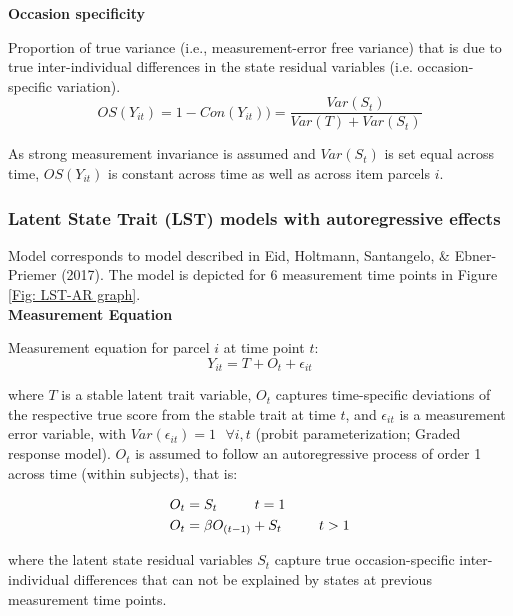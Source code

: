 \textbf{Occasion specificity}

Proportion of true variance (i.e., measurement-error free variance) that is due to true inter-individual differences in the state residual variables (i.e. occasion-specific variation).
\begin{equation}
OS(Y_{it})=1-Con(Y_{it})) = \frac{Var(S_t)}{Var(T)+Var(S_t)}
\end{equation}

As strong measurement invariance is assumed and $Var(S_t)$ is set equal across time, $OS(Y_{it})$ is constant across time as well as across item parcels $i$. 


\subsubsection{Latent State Trait (LST) models with autoregressive effects}

Model corresponds to model described in Eid, Holtmann, Santangelo, \& Ebner-Priemer (2017). The model is depicted for 6 measurement time points in Figure \ref{Fig: LST-AR graph}. \\


\textbf{Measurement Equation}

Measurement equation for parcel $i$ at time point $t$:
\begin{equation}
Y_{it}= T+ O_t + \epsilon_{it}
\end{equation}

where $T$ is a stable latent trait variable, $O_t$ captures time-specific deviations of the respective true score from the stable trait at time $t$, and $\epsilon_{it}$ is a measurement error variable,  with $Var(\epsilon_{it})=1 ~~~\forall i,t$ (probit parameterization; Graded response model). $O_t$ is assumed to follow an autoregressive process of order 1 across time (within subjects), that is:

\begin{align}
O_t  &= S_t ~~~~~~~~t = 1 \notag \\
O_t  &= \beta O_{(t-1)} + S_t~~~~~~~~t > 1 \notag
\end{align}

where the latent state residual variables $S_t$ capture true occasion-specific inter-individual differences that can not be explained by states at previous measurement time points.

